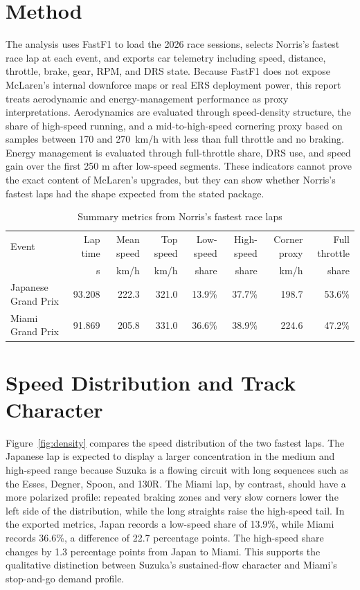 \documentclass[11pt]{article}
\begin{document}
\section{Method}
The analysis uses FastF1 to load the 2026 race sessions, selects Norris's fastest race lap at each event, and exports car telemetry including speed, distance, throttle, brake, gear, RPM, and DRS state. Because FastF1 does not expose McLaren's internal downforce maps or real ERS deployment power, this report treats aerodynamic and energy-management performance as proxy interpretations. Aerodynamics are evaluated through speed-density structure, the share of high-speed running, and a mid-to-high-speed cornering proxy based on samples between 170 and \SI{270}{km/h} with less than full throttle and no braking. Energy management is evaluated through full-throttle share, DRS use, and speed gain over the first 250 m after low-speed segments. These indicators cannot prove the exact content of McLaren's upgrades, but they can show whether Norris's fastest laps had the shape expected from the stated package.

\begin{table}[H]
\centering
\caption{Summary metrics from Norris's fastest race laps}
\begin{tabular}{lrrrrrrr}
\toprule
Event & Lap time & Mean speed & Top speed & Low-speed & High-speed & Corner proxy & Full throttle \\
 & s & km/h & km/h & share & share & km/h & share \\
\midrule
Japanese Grand Prix & 93.208 & 222.3 & 321.0 & 13.9\% & 37.7\% & 198.7 & 53.6\% \\
Miami Grand Prix & 91.869 & 205.8 & 331.0 & 36.6\% & 38.9\% & 224.6 & 47.2\% \\
\bottomrule
\end{tabular}
\end{table}

\section{Speed Distribution and Track Character}
Figure~\ref{fig:density} compares the speed distribution of the two fastest laps. The Japanese lap is expected to display a larger concentration in the medium and high-speed range because Suzuka is a flowing circuit with long sequences such as the Esses, Degner, Spoon, and 130R. The Miami lap, by contrast, should have a more polarized profile: repeated braking zones and very slow corners lower the left side of the distribution, while the long straights raise the high-speed tail. In the exported metrics, Japan records a low-speed share of 13.9\%, while Miami records 36.6\%, a difference of 22.7 percentage points. The high-speed share changes by 1.3 percentage points from Japan to Miami. This supports the qualitative distinction between Suzuka's sustained-flow character and Miami's stop-and-go demand profile.
\end{document}
